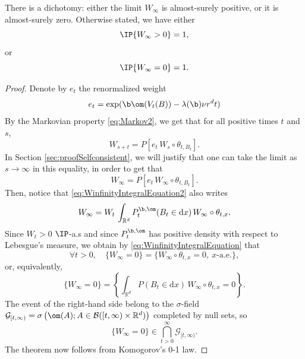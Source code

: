 \begin{theorem}
There is a dichotomy: either the limit $W_\infty$ is almost-surely positive, or it is almost-surely zero. Otherwise stated, we have either
\begin{equation}  \label{eq:WD}
\IP \{W_\infty > 0\} = 1,
\end{equation}
or
\begin{equation} \label{eq:SD}
\IP \{W_\infty = 0\} = 1.
\end{equation}
\end{theorem}
\begin{proof}
Denote by $e_t$ the renormalized weight 
\begin{equation}
e_t = \exp(\b \om(V_t(B)) - \lambda(\b)\nu r^d t)
\end{equation}
By the Markovian property \eqref{eq:Markov2}, we get that for all positive times $t$ and $s$,
\begin{equation} \label{eq:WtIntegralEquation}
W_{s+t} = P [e_{t} \, W_s \circ \theta_{t,B_t} ].
\end{equation}
In Section \ref{sec:proofSelfconsistent}, we will justify that one can take the limit as $s\to\infty$ in this equality, in order to get that
\begin{equation} \label{eq:WinfinityIntegralEquation2}
W_\infty = P [e_{t} \, W_\infty \circ \theta_{t,B_t} ].
\end{equation}
Then, notice that \eqref{eq:WinfinityIntegralEquation2} also writes 
\begin{equation} \label{eq:WinfinityIntegralEquation}
W_\infty = W_t \, \int_{\mathbb{R}^d} P_t^{\b,\om} (B_t \in \mathrm{d} x)\, W_\infty \circ \theta_{t,x}.
\end{equation}
Since $W_t > 0$ $\IP$-a.s and since $P_t^{\b,\om}$ has positive density with respect to Lebesgue's measure, we obtain by \eqref{eq:WinfinityIntegralEquation} that
\[ \forall t>0, \quad \{W_\infty = 0\} = \{W_\infty \circ \theta_{t,x} = 0, \ x\text{-a.e.}\}, \]
or, equivalently,
\[  \{W_\infty = 0\} = \left\{ \int_{\mathbb{R}^d} P (B_t \in \mathrm{d} x)\, W_\infty \circ \theta_{t,x} =0 \right\}.
 \]
The event of the right-hand side belong 
to the $\sigma$-field $\mathcal{G}_{[t,\infty)} = \sigma\left(\om(A) ; A \in \mathcal{B}([t,\infty) \times \mathbb{R}^d) \right)$ completed by null sets, so
\[\{W_\infty = 0\} \in \bigcap_{t>0}^\infty \mathcal{G}_{[t,\infty)}.\]
The theorem now follows from Komogorov's 0-1 law.
\end{proof}

